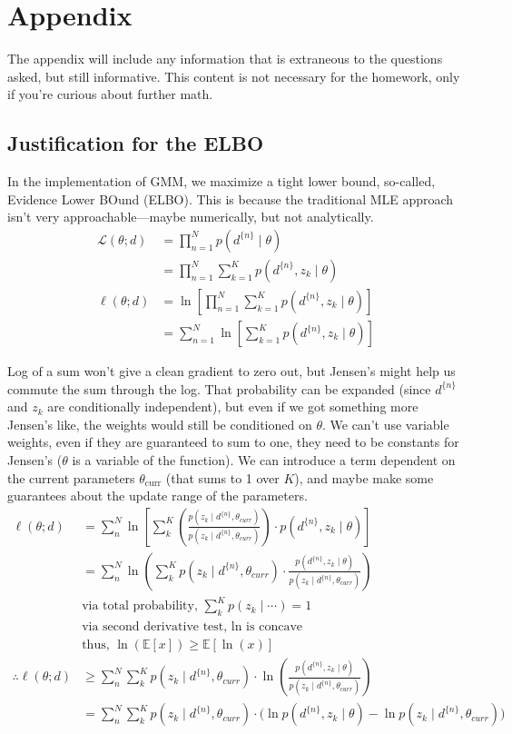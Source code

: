 \newpage
\section*{Appendix}
The appendix will include any information that is extraneous to the questions asked, but still informative. This content is not necessary for the homework, only if you're curious about further math.
\subsection*{Justification for the ELBO}

In the implementation of GMM, we maximize a tight lower bound, so-called, Evidence Lower BOund (ELBO). This is because the traditional MLE approach isn't very approachable—maybe numerically, but not analytically.
\begin{align*}
    \mathcal{L}(\theta; d) &= \prod_{n=1}^N p(d^{\{n\}} \mid\theta) \\
    &= \prod_{n=1}^N \sum_{k=1}^K p(d^{\{n\}},z_k\mid\theta) \\
    \ell(\theta; d) &= \ln\left[ \prod_{n=1}^N \sum_{k=1}^K p(d^{\{n\}},z_k\mid\theta) \right] \\
    &= \sum_{n=1}^N \ln\left[ \sum_{k=1}^K p(d^{\{n\}},z_k\mid\theta) \right]
\end{align*}

Log of a sum won't give a clean gradient to zero out, but Jensen's might help us commute the sum through the log. That probability can be expanded (since $d^{\{n\}}$ and $z_k$ are conditionally independent), but even if we got something more Jensen's like, the weights would still be conditioned on $\theta$. We can't use variable weights, even if they are guaranteed to sum to one, they need to be constants for Jensen's ($\theta$ is a variable of the function). We can introduce a term dependent on the current parameters $\theta_{\text{curr}}$ (that sums to 1 over $K$), and maybe make some guarantees about the update range of the parameters.
\begin{align*}
    \ell(\theta; d) &= \sum_n^N\ln\left[\sum_k^K \left(\frac{p(z_k\mid d^{\{n\}},\theta_{curr})}{p(z_k\mid d^{\{n\}},\theta_{curr})}\right) \cdot p(d^{\{n\}},z_k\mid\theta)\right] \\
    &= \sum_n^N\ln\left(\sum_k^K p(z_k\mid d^{\{n\}},\theta_{curr})\cdot\frac{p(d^{\{n\}},z_k\mid\theta)}{p(z_k\mid d^{\{n\}},\theta_{curr})}\right) \\
    &\text{via total probability, }\textstyle\sum_k^K p(z_k\mid \cdots)=1 \\
    &\text{via second derivative test, ln is concave} \\
    &\text{thus, }\ln(\mathbb{E}[x])\geq \mathbb{E}[\ln(x)] \\
    \therefore \ell(\theta; d) &\geq \sum_n^N\sum_k^K p(z_k\mid d^{\{n\}},\theta_{curr})\cdot\ln\left(\frac{p(d^{\{n\}},z_k\mid\theta)}{p(z_k\mid d^{\{n\}},\theta_{curr})}\right) \\
    &= \sum_n^N\sum_k^K p(z_k\mid d^{\{n\}},\theta_{curr})\cdot\Bigg(\ln p(d^{\{n\}},z_k\mid\theta) - \ln p(z_k\mid d^{\{n\}},\theta_{curr}) \Bigg)
\end{align*}

